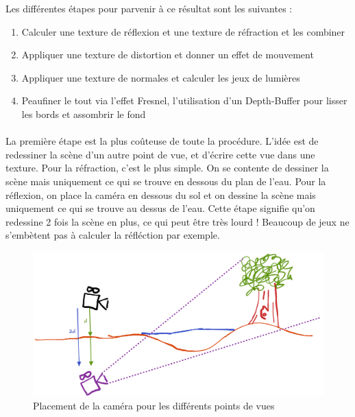 \documentclass{EPUProjetDi}
\begin{document}
Les différentes étapes pour parvenir à ce résultat sont les suivantes :


\begin{enumerate}
\item Calculer une texture de réflexion et une texture de réfraction et les combiner
\item Appliquer une texture de distortion et donner un effet de mouvement
\item Appliquer une texture de normales et calculer les jeux de lumières
\item Peaufiner le tout via l'effet Fresnel, l'utilisation d'un Depth-Buffer pour lisser les bords et assombrir le fond
\end{enumerate}

\paragraph{}
La première étape est la plus coûteuse de toute la procédure. L'idée est de redessiner la scène d'un autre point de vue, et d'écrire cette vue dans une texture.
Pour la réfraction, c'est le plus simple. On se contente de dessiner la scène mais uniquement ce qui se trouve en dessous du plan de l'eau.
Pour la réflexion, on place la caméra en dessous du sol et on dessine la scène mais uniquement ce qui se trouve au dessus de l'eau.
Cette étape signifie qu'on redessine 2 fois la scène en plus, ce qui peut être très lourd ! Beaucoup de jeux ne s'embètent pas à calculer la réfléction par exemple.

\begin{figure}[h]
	\centering
	\includegraphics[scale=.3]{water_camera}
	\caption{Placement de la caméra pour les différents points de vues}
	\label{fig:water_camera}
\end{figure}
\end{document}
